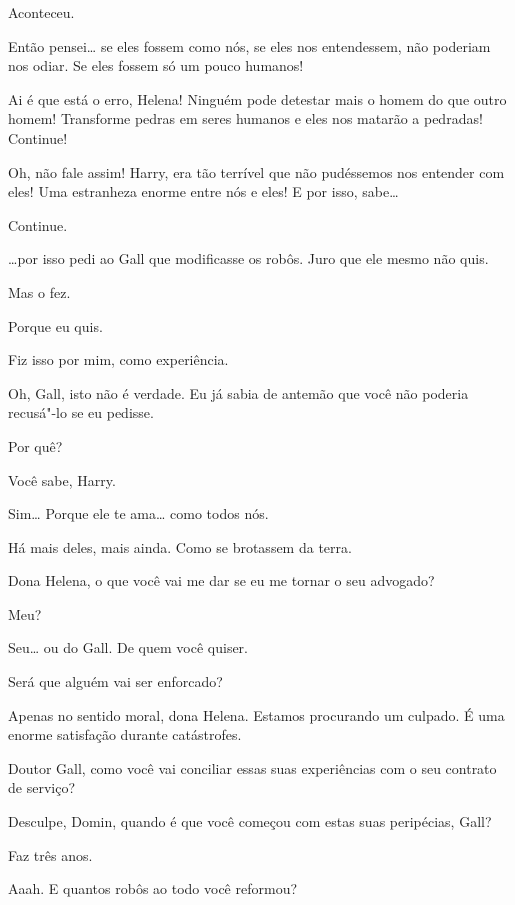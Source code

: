  Aconteceu.

 Então pensei\ldots{} se eles fossem como nós, se eles nos entendessem,
não poderiam nos odiar. Se eles fossem só um pouco humanos!

 Ai é que está o erro, Helena! Ninguém pode detestar mais o homem do que
outro homem! Transforme pedras em seres humanos e eles nos matarão a pedradas!
Continue!

 Oh, não fale assim! Harry, era tão terrível que não pudéssemos nos
entender com eles! Uma estranheza enorme entre nós e eles! E por isso, sabe\ldots{}

 Continue.

 \ldots{}por isso pedi ao Gall que modificasse os robôs. Juro que ele mesmo
não quis.

 Mas o fez.

 Porque eu quis.

 Fiz isso por mim, como experiência.

 Oh, Gall, isto não é verdade. Eu já sabia de antemão que você não
poderia recusá"-lo se eu pedisse.

 Por quê?

 Você sabe, Harry.

 Sim\ldots{} Porque ele te ama\ldots{} como todos nós.


  Há mais deles, mais ainda. Como se brotassem da terra.

 Dona Helena, o que você vai me dar se eu me tornar o seu advogado?

 Meu?

 Seu\ldots{} ou do Gall. De quem você quiser.

 Será que alguém vai ser enforcado?

 Apenas no sentido moral, dona Helena. Estamos procurando um culpado. É
uma enorme satisfação durante catástrofes.

 Doutor Gall, como você vai conciliar essas suas experiências com o seu
contrato de serviço?

 Desculpe, Domin, quando é que você começou com estas suas peripécias,
Gall?

 Faz três anos.

 Aaah. E quantos robôs ao todo você reformou?

